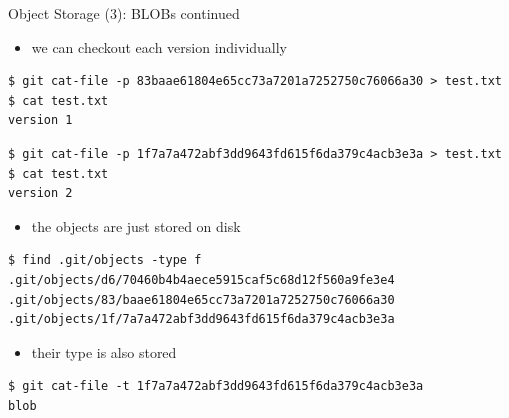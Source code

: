 \begin{frame}[fragile]{Object Storage (3): BLOBs continued}
  \begin{itemize}
    \item we can checkout each version individually
  \end{itemize}
\begin{lstlisting}[style=ShellCmd]
$ git cat-file -p 83baae61804e65cc73a7201a7252750c76066a30 > test.txt
$ cat test.txt
version 1
\end{lstlisting}

\begin{lstlisting}[style=ShellCmd]
$ git cat-file -p 1f7a7a472abf3dd9643fd615f6da379c4acb3e3a > test.txt
$ cat test.txt
version 2
\end{lstlisting}

\begin{itemize}
  \item the objects are just stored on disk
\end{itemize}

\begin{lstlisting}[style=ShellCmd]
$ find .git/objects -type f
.git/objects/d6/70460b4b4aece5915caf5c68d12f560a9fe3e4
.git/objects/83/baae61804e65cc73a7201a7252750c76066a30
.git/objects/1f/7a7a472abf3dd9643fd615f6da379c4acb3e3a
\end{lstlisting}

\begin{itemize}
  \item their type is also stored
\end{itemize}

\begin{lstlisting}[style=ShellCmd]
$ git cat-file -t 1f7a7a472abf3dd9643fd615f6da379c4acb3e3a
blob
\end{lstlisting}

\end{frame}

